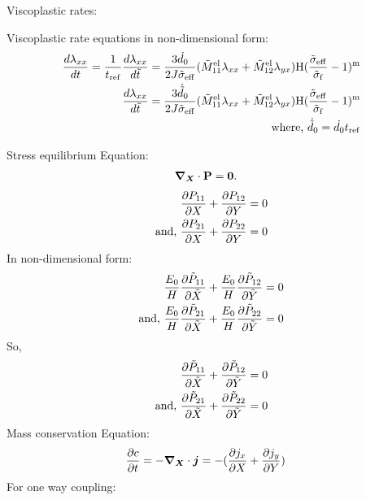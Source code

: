 \documentclass[../main.tex]{subfiles}
\begin{document}
Viscoplastic rates: 



Viscoplastic rate equations in non-dimensional form:
\begin{align}
    \diff{\lamxx}{t} = \fc{1}{t_{\rm{ref}}}\diff{\lamxx}{\tt} = \fc{3\dot{d_0}}{2 J \tsigmaeff}(\tMel{11} \lamxx + \tMel{12}\lamyx)\HS(\fc{\tsigmaeff}{\tsigmaf} - 1 )^\m \\
   \diff{\lamxx}{\tt} = \fc{3\dot{\td{d}}_0}{2 J \tsigmaeff}(\tMel{11} \lamxx + \tMel{12}\lamyx)\HS(\fc{\tsigmaeff}{\tsigmaf} - 1 )^\m\\
   \text{where, } \dot{\td{d}}_0 = \dot{d_0} t_{\rm{ref}}
\end{align}

Stress equilibrium Equation:
\begin{align}
    \nablaX \cdot \PK &= \bm{0}.
\end{align}
\begin{align}
    \pdiff{P_{11}}{X} + \pdiff{P_{12}}{ Y} &= 0 \\
    \text{and, } \pdiff{P_{21}}{X} + \pdiff{P_{22}}{Y} &= 0
\end{align}
In non-dimensional form:
\begin{align}
    \fc{E_0}{H} \pdiff{\tP{11}}{\tX} + \fc{E_0}{H} \pdiff{\tP{12}}{\tY} &= 0 \\
    \text{and, } \fc{E_0}{H} \pdiff{\tP{21}}{\tX} + \fc{E_0}{H} \pdiff{\tP{22}}{\tY} &= 0 
\end{align}
So, 
\begin{align}
    \pdiff{\tP{11}}{\tX} + \pdiff{\tP{12}}{\tY} &= 0 \\
    \text{and, }   \pdiff{\tP{21}}{\tX} +  \pdiff{\tP{22}}{\tY} &= 0 
\end{align}
Mass conservation Equation:
\begin{align}
    \pdiff{c}{t} &= - \nablaX \cdot \bm{j} = -(\pdiff{j_x}{X} + \pdiff{j_y}{ Y}) 
\end{align}
For one way coupling:
\end{document}
